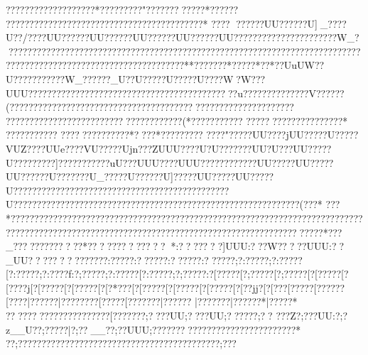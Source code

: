 {{{{{{{{{{{{{{{{{{{{{{{{{{{{{{{{{{{{{{{{{{{{{{{{{{{{{{{{{{{{{{{{{{{{{{{{{{{{{{{{{{{{{{{{{{{{{{{{{{{{{{{{{{{{{{{{{{{{{{{{{{{{{{{{{{{{{{{{{{{{{{{{{{{{{{{{{{{{{{{{{{{{{{{{{{{{{{{{{{{{{{{{{{{{{{{{{{{{{{{{{{{{{{{{{{{{{{{{{{{{{{{{{{{{{{{{{{{{{{{{{{{{{{{{{{{{{{{{{{{{{{{{{{{{{{{{{{{{{{{{{{{{{{{{{{{{{{{{{{{{{{{{{{{{{{{{{{{{{{{{{{{{{{{{{{{{{{{{{{{{{{{{{{{{{{{{{{{{{{{{{{{{{{{{{{{{{{{{{{{{{{{{{{{{{{{{{{{{{{{{{{{{{{{{{{{{{{{{{{{{{{{{{{{{{{{{{{{{{{{{{{{{{{{{{{{{{{{{{{{{{{{{{{{{{{{{{{{{{{{{{{{{{{{{{{{{{{{{{{{{{{{{{{{{{{{{{{{{{{{{{{{{{{{{{{{{{{{{{{{{{{{{{{{{{{{{{{{{{{{{{{{{{{{{{{{{{{{{{{{{{{{{{{{{{{{{{{{{{{{{{{{{{{{{{{{{{{{{{{{{{{{{{{{{{{{{{{{{{{{{{{{{{{{{{{{{{{{{{{{{{{{{{{{{{{{{{{{{{{{{{{{{{{{{{{{{{{{{{{{{{{{{{{{{{{{{{{{{{{{{{{{{{{{{{{{{{{{{{{{{{{{{{{{{{{{{{{{{{{{{{{{{{{{{{{{{{{{{{{{{{{{{{{{{{{{{{{{{{{{{{{{{{{{{{{{{{{{{{{{{{{{{{{{{{{{{{{{{{{{{{{{{{{{{{{{{{{{{{{{{{{{{{{{{{{{{{{{{{{{{{{{{{{{{{{{{{{{{{{{{{{{{{{{{{{{{{{{{{{{{{{{{{{{{{{{{{{{{{{{{{{{{{{{{{{{{{{{{{{{{{{{{{{{{{{{{{{{{{{{{{{{{{{{{{{{{{{{{{{{{{{{{{{{{{{{{{{{{{{{{{{{{{{{{{{{{{{{{{{{{{{{{{{{{{{{{{{{{{{{{{{{{{{{{{{{{{{{{{{{{{{{{{{{{{{{{{{{{{{{{{{{{{{{{{{{{{{{{{{{{{{{{{{{{{{{{{{{{{{{{{{{{{{{{{{{{{{{{{{{{{{{{{{{{{{{{{{{{{{{{{{{{{{{{{{{{{{{{{{{{{{{{{{{{{{{{{{{{{{{{{{{{{{{{{{{{{{{{{{{{{{{{{{{{{{{{{{{{{{{{{{{{{{{{{{{{{{{{{{{{{{{{{{{{{{{{{{{{{{{{{{{{{{{{{{{{{{{{{{{{{{{{{{{{{{{{{{{{{{{{{{{{{{{{{{{{{{{{{{{{{{{{{{{{{{{{{{{{{{{{{{{{{{{{{{{{{{{{{{{{{{{{{{{???????????????????*?????????"??????? ?????*??????
??????? ??????? ??????? ????? ??????? ?????????*
????
??????UU??????U]_????U??/????UU??????UU??????UU??????UU??????UU??????????????????????W_??????????????????????????????????????????????????????????????????????????????????????????????????????????????????**????  ???*  ?????* ??*   ??UuUW??U???????????W_??????_U??U?????U?????U}????W?W???UUU????????????????????????????????????? ???????u??????????????V??????(?????? ????????????????????????????????????? ?????? ?????? ?????
 ?????? ?????? ?????????????????????????(*?????? ?????  ????? ?????  ??????????*
  ?????  ??????
????  ?????  ?????* ????* ?????  ????
  ????"  ?????UU????jUU?????U?????VUZ????UUe????VU?????Ujn???ZUUU????U?U???  ? ???UU?U???UU?????U?????????]???????????uU???UUU????UUU????????????UU?????UU?????UU??????U???????U_?????U??????U]?????UU?????UU?????U??????????????????????????????????????????????U????????????????????????????????????????????????????????????? (???*
???*  ??????????????????????????????????????????????????????????????????????????????????????????????????????????????????????????????????? ?????? ?????*  ???_?????????????*???? ?????  ???? *:???????]UUU:???W?????UUU:??_UU??????????????:?????:??????:??????:??????;?:?????;?:?????[?:?????;?:????f:?;?????;?:?????[?:?????;?;?????:?[?????[?;?????[?;?????[?[?????[?[????j[?[?????[?[?????[?[?*???[?[?????[?[?????[?[?????[?[??jj?[?[???[?{???{?[?????{?[????|?{?????|?{???????[?????[???????|??????
|???????|??????*|?????*
??? ??????????????????[???????;????UU;????UU;??????;??
???Z?;???UU:?;?z__U??;?????|?;??__??;??UUU;??? ?? ?????????\?????????????\?????*
??;???????\?????????????????????????????????????;??? }}}}}}}}}}}}}}}}}}}}}}}}}}}}}}}}}}}}}}}}}}}}}}}}}}}}}}}}}}}}}}}}}}}}}}}}}}}}}}}}}}}}}}}}}}}}}}}}}}}}}}}}}}}}}}}}}}}}}}}}}}}}}}}}}}}}}}}}}}}}}}}}}}}}}}}}}}}}}}}}}}}}}}}}}}}}}}}}}}}}}}}}}}}}}}}}}}}}}}}}}}}}}}}}}}}}}}}}}}}}}}}}}}}}}}}}}}}}}}}}}}}}}}}}}}}}}}}}}}}}}}}}}}}}}}}}}}}}}}}}}}}}}}}}}}}}}}}}}}}}}}}}}}}}}}}}}}}}}}}}}}}}}}}}}}}}}}}}}}}}}}}}}}}}}}}}}}}}}}}}}}}}}}}}}}}}}}}}}}}}}}}}}}}}}}}}}}}}}}}}}}}}}}}}}}}}}}}}}}}}}}}}}}}}}}}}}}}}}}}}}}}}}}}}}}}}}}}}}}}}}}}}}}}}}}}}}}}}}}}}}}}}}}}}}}}}}}}}}}}}}}}}}}}}}}}}}}}}}}}}}}}}}}}}}}}}}}}}}}}}}}}}}}}}}}}}}}}}}}}}}}}}}}}}}}}}}}}}}}}}}}}}}}}}}}}}}}}}}}}}}}}}}}}}}}}}}}}}}}}}}}}}}}}}}}}}}}}}}}}}}}}}}}}}}}}}}}}}}}}}}}}}}}}}}}}}}}}}}}}}}}}}}}}}}}}}}}}}}}}}}}}}}}}}}}}}}}}}}}}}}}}}}}}}}}}}}}}}}}}}}}}}}}}}}}}}}}}}}}}}}}}}}}}}}}}}}}}}}}}}}}}}}}}}}}}}}}}}}}}}}}}}}}}}}}}}}}}}}}}}}}}}}}}}}}}}}}}}}}}}}}}}}}}}}}}}}}}}}}}}}}}}}}}}}}}}}}}}}}}}}}}}}}}}}}}}}}}}}}}}}}}}}}}}}}}}}}}}}}}}}}}}}}}}}}}}}}}}}}}}}}}}}}}}}}}}}}}}}}}}}}}}}}}}}}}}}}}}}}}}}}}}}}}}}}}}}}}}}}}}}}}}}}}}}}}}}}}}}}}}}}}}}}}}}}}}}}}}}}}}}}}}}}}}}}}}}}}}}}}}}}}}}}}}}}}}}}}}}}}}}}}}}}}}}}}}}}}}}}}}}}}}}}}}}}}}}}}}}}}}}}}}}}}}}}}}}}}}}}}}}}}}}}}}}}}}}}}}}}}}}}}}}}}}}}}}}}}}}}}}}}}}}}}}}}}}}}}}}}}}}}}}}}}}}}}}}}}}}}}}}}}}}}}}}}}}}}}}}}}}}}}}}}}}}}}}}}}}}}}}}}}}}}}}}}}}}}}}}}}}}}}}}}}}}}}}}}}}}}}}}}}}}}}}}}}}}}}}}}}}}}}}}}}}}}}}}}}}}}}}}}}}}}}}}}}}}}}}}}}}}}}}}}}}}}}}}}}}}}}}}}}}}}}}}}}}}}}}}}}}}}}}}}}}}}}
